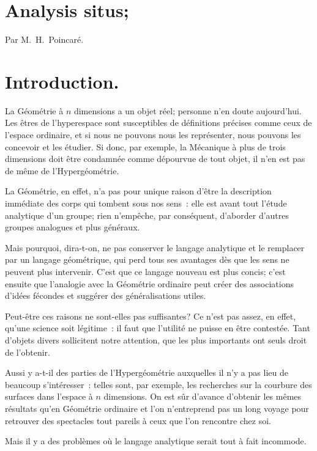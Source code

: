 \documentclass{article}
\begin{document}

\section*{Analysis situs;}

Par M.~H.~Poincaré.

\section*{Introduction.}

La Géométrie à $n$ dimensions a un objet réel; personne n'en doute aujourd'hui. Les êtres de l'hyperespace sont susceptibles de définitions précises comme ceux de l'espace ordinaire, et si nous ne pouvons nous les représenter, nous pouvons les concevoir et les étudier. Si donc, par exemple, la Mécanique à plus de trois dimensions doit être condamnée comme dépourvue de tout objet, il n'en est pas de même de l'Hypergéométrie.

La Géométrie, en effet, n'a pas pour unique raison d'être la description immédiate des corps qui tombent sous nos sens~: elle est avant tout l'étude analytique d'un groupe; rien n'empêche, par conséquent, d'aborder d'autres groupes analogues et plus généraux.

Mais pourquoi, dira-t-on, ne pas conserver le langage analytique et le remplacer par un langage géométrique, qui perd tous ses avantages dès que les sens ne peuvent plus intervenir. C'est que ce langage nouveau est plus concis; c'est ensuite que l'analogie avec la Géométrie ordinaire peut créer des associations d'idées fécondes et suggérer des généralisations utiles.

Peut-être ces raisons ne sont-elles pas suffisantes? Ce n'est pas assez, en effet, qu'une science soit légitime~: il faut que l'utilité ne puisse en être contestée. Tant d'objets divers sollicitent notre attention, que les plus importants ont seuls droit de l'obtenir.

Aussi y a-t-il des parties de l'Hypergéométrie auxquelles il n'y a pas lieu de beaucoup s'intéresser~: telles sont, par exemple, les recherches sur la courbure des surfaces dans l'espace à $n$ dimensions. On est sûr d'avance d'obtenir les mêmes résultats qu'en Géométrie ordinaire et l'on n'entreprend pas un long voyage pour retrouver des spectacles tout pareils à ceux que l'on rencontre chez soi.

Mais il y a des problèmes où le langage analytique serait tout à fait incommode.
\end{document}

